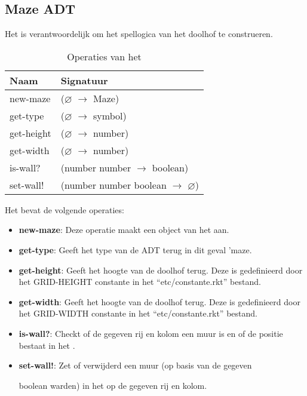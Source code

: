 
\subsection{Maze ADT}
\label{section:maze}
Het \texttt{} is verantwoordelijk om het spellogica van het doolhof te construeren.

\begin{table}[hbt]
\centering
\begin{tabular}{|ll|}
\hline
\rowcolor[HTML]{000000} 
{\color[HTML]{FFFFFF} \textbf{Naam}} & {\color[HTML]{FFFFFF} \textbf{Signatuur}} \\ \hline
new-maze   & ($\varnothing$ $\rightarrow$ Maze)                          \\ \hline
get-type   & ($\varnothing$ $\rightarrow$ symbol)                        \\ \hline
get-height & ($\varnothing$ $\rightarrow$ number)                        \\ \hline
get-width  & ($\varnothing$ $\rightarrow$ number)                        \\ \hline
is-wall?   & (number number $\rightarrow$ boolean)                       \\ \hline
set-wall!  & (number number boolean $\rightarrow$ $\varnothing$)         \\ \hline
\end{tabular}
\caption{Operaties van het \texttt{}}
\label{table:maze}
\end{table}

Het \texttt{} bevat de volgende operaties:

\begin{itemize}
	\item \textbf{new-maze}: Deze operatie maakt een object van het \texttt{} aan.
	\item \textbf{get-type}: Geeft het type van de ADT terug in dit geval 'maze.
	\item \textbf{get-height}: Geeft het hoogte van de doolhof terug.
		Deze is gedefinieerd door het GRID-HEIGHT constante in het ``etc/constante.rkt'' bestand.
	\item \textbf{get-width}: Geeft het hoogte van de doolhof terug.
		Deze is gedefinieerd door het GRID-WIDTH constante in het ``etc/constante.rkt'' bestand.
	\item \textbf{is-wall?}: Checkt of de gegeven rij en kolom een muur is en of de positie bestaat in het \texttt{}.
	\item \textbf{set-wall!}: Zet of verwijderd een muur 
		(op basis van de gegeven

		boolean warden) in het \texttt{} op de gegeven rij en kolom.
\end{itemize}

